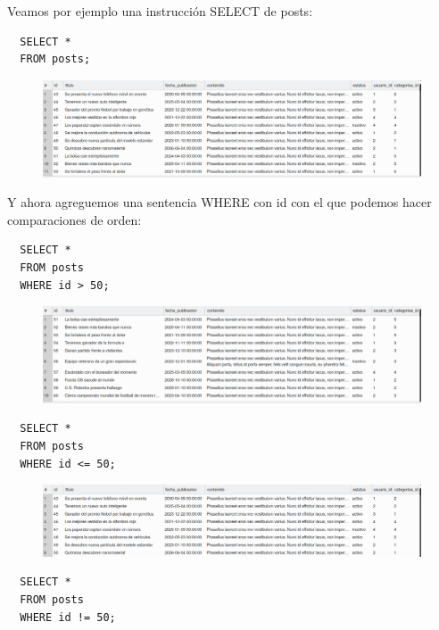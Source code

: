 \documentclass{article}
\begin{document}
Veamos por ejemplo una instrucción SELECT de posts:

\begin{verbatim}
  SELECT *
  FROM posts;
\end{verbatim}

\begin{figure}[h!]
  \centering
  \includegraphics[scale=0.5]{./Pictures/102_where.png}
\end{figure}

Y ahora agreguemos una sentencia WHERE con id con el que podemos hacer comparaciones de orden:

\begin{verbatim}
  SELECT *
  FROM posts
  WHERE id > 50;
\end{verbatim}

\begin{figure}[h!]
  \centering
  \includegraphics[scale=0.5]{./Pictures/103_where.png}
\end{figure}

\begin{verbatim}
  SELECT *
  FROM posts
  WHERE id <= 50;
\end{verbatim}

\begin{figure}[h!]
  \centering
  \includegraphics[scale=0.5]{./Pictures/104_where.png}
\end{figure}


\begin{verbatim}
  SELECT *
  FROM posts
  WHERE id != 50;
\end{verbatim}
\end{document}
